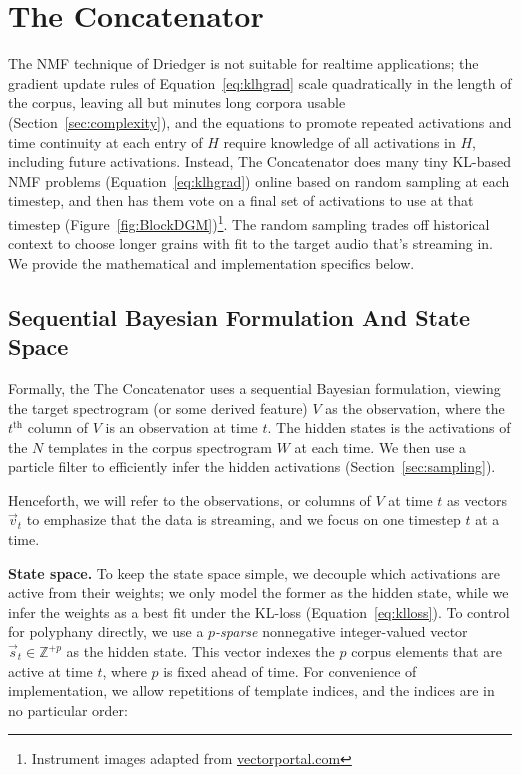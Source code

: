 \documentclass{article}
\begin{document}
\section{The Concatenator}



The NMF technique of Driedger is not suitable for realtime applications; the gradient update rules of Equation~\ref{eq:klhgrad} scale quadratically in the length of the corpus, leaving all but minutes long corpora usable (Section~\ref{sec:complexity}), and the equations to promote repeated activations and time continuity at each entry of $H$ require knowledge of all activations in $H$, including future activations.  Instead, The Concatenator does many tiny KL-based NMF problems (Equation~\ref{eq:klhgrad}) online based on random sampling at each timestep, and then has them vote on a final set of activations to use at that timestep (Figure~\ref{fig:BlockDGM})\footnote{Instrument images adapted from \url{vectorportal.com}}.  The random sampling trades off historical context to choose longer grains with fit to the target audio that's streaming in.  We provide the mathematical and implementation specifics below.

\subsection{Sequential Bayesian Formulation And State Space}
\label{sec:bayesian}

    Formally, the The Concatenator uses a sequential Bayesian formulation, viewing the target spectrogram (or some derived feature) $V$ as the observation, where the $t^{\text{th}}$ column of $V$ is an observation at time $t$.  The hidden states is the activations of the $N$ templates in the corpus spectrogram $W$ at each time.  We then use a particle filter to efficiently infer the hidden activations (Section~\ref{sec:sampling}).
    
    Henceforth, we will refer to the observations, or columns of $V$ at time $t$ as vectors $\vec{v}_t$ to emphasize that the data is streaming, and we focus on one timestep $t$ at a time.  
    
    \textbf{State space.} To keep the state space simple, we decouple which activations are active from their weights; we only model the former as the hidden state, while we infer the weights as a best fit under the KL-loss (Equation~\ref{eq:klloss}).  To control for polyphany directly, we use a {\em $p$-sparse} nonnegative integer-valued vector $\vec{s}_t \in \mathbb{Z}^{+p}$ as the hidden state.  This vector indexes the $p$ corpus elements that are active at time $t$, where $p$ is fixed ahead of time.  For convenience of implementation, we allow repetitions of template indices, and the indices are in no particular order:%
\end{document}
